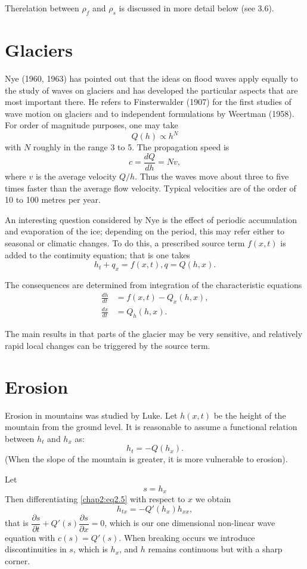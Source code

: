 The\pageoriginale relation between $\rho_f$ and $\rho_s$ is discussed in more detail below (see 3.6).

\section{Glaciers}\label{chap2:sec2.4}

Nye (1960, 1963) has pointed out that the ideas on flood waves apply equally to the study of waves on glaciers and has developed the particular aspects that are most important there. He refers to Finsterwalder (1907) for the first studies of wave motion on glaciers and to independent formulations by Weertman (1958). For order of magnitude purposes, one may take
$$
Q(h)\propto h^N
$$
with $N$ roughly in the range 3 to 5. The propagation speed is 
$$
c=\frac{dQ}{dh}=Nv,
$$
where $v$ is the average velocity $Q/h$. Thus the waves move about three to five times faster than the average flow velocity. Typical velocities are of the order of 10 to 100 metres per year.

An interesting question considered by Nye is the effect of periodic accumulation and evaporation of the ice; depending on the period, this may refer either to seasonal or climatic changes. To do this, a prescribed source term $f(x,t)$ is added to the continuity equation; that is one takes
$$
h_t+q_x=f(x,t),q=Q(h,x).
$$

The consequences are determined from integration of the characteristic equations
\begin{align*}
\frac{dh}{dt} &= f(x,t)-Q_x(h,x),\\
\frac{dx}{dt} &= Q_h(h,x).
\end{align*}\pageoriginale

The main results in that parts of the glacier may be very sensitive, and relatively rapid local changes can be triggered by the source term.

\section{Erosion}\label{chap2:sec2.5}

Erosion in mountains was studied by Luke. Let $h(x,t)$ be the height of the mountain from the ground level. It is reasonable to assume a functional relation between $h_t$ and $h_x$ as:
$$
h_t=-Q\left(h_x\right).
$$
(When the slope of the mountain is greater, it is more vulnerable to erosion).

Let
\begin{equation}
s=h_x\tag{2.5}\label{chap2:eq2.5}
\end{equation}
Then differentiating \eqref{chap2:eq2.5} with respect to $x$ we obtain 
$$
h_{tx}=-Q'\left(h_x\right)h_{xx},
$$
that is $\dfrac{\partial s}{\partial t}+Q'(s)\dfrac{\partial
  s}{\partial x}=0$, which is our one dimensional non-linear wave
equation with $c(s)=Q'(s)$. When breaking occurs we introduce
discontinuities in $s$, which is $h_x$, and $h$ remains continuous but
with a sharp corner. 
